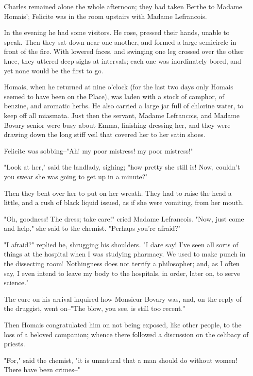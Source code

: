 \documentclass[11pt,twocolumn]{ltugboat}
\begin{document}
Charles remained alone the whole afternoon; they had taken Berthe
to Madame Homais'; Felicite was in the room upstairs with Madame
Lefrancois.

In the evening he had some visitors. He rose, pressed their hands,
unable to speak. Then they sat down near one another, and formed a large
semicircle in front of the fire. With lowered faces, and swinging one
leg crossed over the other knee, they uttered deep sighs at intervals;
each one was inordinately bored, and yet none would be the first to go.

Homais, when he returned at nine o'clock (for the last two days only
Homais seemed to have been on the Place), was laden with a stock of
camphor, of benzine, and aromatic herbs. He also carried a large jar
full of chlorine water, to keep off all miasmata. Just then the servant,
Madame Lefrancois, and Madame Bovary senior were busy about Emma,
finishing dressing her, and they were drawing down the long stiff veil
that covered her to her satin shoes.

Felicite was sobbing--"Ah! my poor mistress! my poor mistress!"

"Look at her," said the landlady, sighing; "how pretty she still is!
Now, couldn't you swear she was going to get up in a minute?"

Then they bent over her to put on her wreath. They had to raise the head
a little, and a rush of black liquid issued, as if she were vomiting,
from her mouth.

"Oh, goodness! The dress; take care!" cried Madame Lefrancois. "Now,
just come and help," she said to the chemist. "Perhaps you're afraid?"

"I afraid?" replied he, shrugging his shoulders. "I dare say! I've seen
all sorts of things at the hospital when I was studying pharmacy. We
used to make punch in the dissecting room! Nothingness does not terrify
a philosopher; and, as I often say, I even intend to leave my body to
the hospitals, in order, later on, to serve science."

The cure on his arrival inquired how Monsieur Bovary was, and, on
the reply of the druggist, went on--"The blow, you see, is still too
recent."

Then Homais congratulated him on not being exposed, like other people,
to the loss of a beloved companion; whence there followed a discussion
on the celibacy of priests.

"For," said the chemist, "it is unnatural that a man should do without
women! There have been crimes--"
\end{document}
